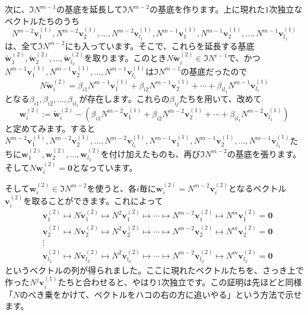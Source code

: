 次に、$\Im N^{m - 1}$の基底を延長して$\Im N^{m - 2}$の基底を作ります。上に現れた$1$次独立なベクトルたちのうち
\[
N^{m - 2} \bm{v}^{(1)}_{1}, N^{m - 2} \bm{v}^{(1)}_{2}, \ldots, N^{m - 2} \bm{v}^{(1)}_{l_1}, N^{m - 1} \bm{v}^{(1)}_{1}, N^{m - 1} \bm{v}^{(1)}_{2}, \ldots, N^{m - 1} \bm{v}^{(1)}_{l_1}
\]
は、全て$\Im N^{m - 2}$にも入っています。そこで、これらを延長する基底$\tilde{\bm{w}}^{(2)}_1, \tilde{\bm{w}}^{(2)}_2, \ldots, \tilde{\bm{w}}^{(2)}_{l_2}$を取ります。このとき$N \tilde{\bm{w}}^{(2)}_i \in \Im N^{i - 1}$で、かつ$N^{m - 1}\bm{v}^{(1)}_1, N^{m - 1}\bm{v}^{(1)}_2, \ldots, N^{m - 1}\bm{v}^{(1)}_{l_1}$は$\Im N^{m - 1}$の基底だったので
\[
N \tilde{\bm{w}}^{(2)}_i = \beta_{i1} N^{m - 1}\bm{v}^{(1)}_1 + \beta_{i2} N^{m - 1}\bm{v}^{(1)}_2 + \cdots + \beta_{i l_1} N^{m - 1}\bm{v}^{(1)}_{l_1}
\]
となる$\beta_{i1}, \beta_{i2}, \ldots, \beta_{i l_1}$が存在します。これらの$\beta_{ij}$たちを用いて、改めて
\[
\bm{w}^{(2)}_i := \tilde{\bm{w}}^{(2)}_i - (\beta_{i1} N^{m - 2}\bm{v}^{(1)}_1 + \beta_{i2} N^{m - 2}\bm{v}^{(1)}_2 + \cdots + \beta_{i l_1} N^{m - 2}\bm{v}^{(1)}_{l_1})
\]
と定めてみます。すると$N^{m - 2} \bm{v}^{(1)}_{1}, N^{m - 2} \bm{v}^{(1)}_{2}, \ldots, N^{m - 2} \bm{v}^{(1)}_{l_1}, N^{m - 1} \bm{v}^{(1)}_{1}, N^{m - 1} \bm{v}^{(1)}_{2}, \ldots, N^{m - 1} \bm{v}^{(1)}_{l_1}$たちに$\bm{w}^{(2)}_1, \bm{w}^{(2)}_2, \ldots, \bm{w}^{(2)}_{l_2}$を付け加えたものも、再び$\Im N^{m - 2}$の基底を張ります。そして$N \bm{w}^{(2)}_i = \bm{0}$となっています。

そして$\bm{w}^{(2)}_i \in \Im N^{m - 2}$を使うと、各$i$毎に$\bm{w}^{(2)}_i = N^{m - 2} \bm{v}^{(2)}_i$となるベクトル$\bm{v}^{(2)}_i$を取ることができます。これによって
\begin{align*}
&\bm{v}^{(2)}_1 \mapsto N \bm{v}^{(2)}_1 \mapsto N^2 \bm{v}^{(2)}_1 \mapsto \cdots \mapsto N^{m - 2} \bm{v}^{(2)}_1 \mapsto N^m \bm{v}^{(2)}_1 = \bm{0} \\
&\bm{v}^{(2)}_2 \mapsto N \bm{v}^{(2)}_2 \mapsto N^2 \bm{v}^{(2)}_2 \mapsto \cdots \mapsto N^{m - 2} \bm{v}^{(2)}_2 \mapsto N^m \bm{v}^{(2)}_2 = \bm{0} \\
&\vdots \\
&\bm{v}^{(2)}_{l_2} \mapsto N \bm{v}^{(2)}_{l_2} \mapsto N^2 \bm{v}^{(2)}_{l_2} \mapsto \cdots \mapsto N^{m - 2} \bm{v}^{(2)}_{l_2} \mapsto N^m \bm{v}^{(2)}_{l_2} = \bm{0}
\end{align*}
というベクトルの列が得られました。ここに現れたベクトルたちを、さっき上で作った$N^j \bm{v}^{(1)}_i$たちと合わせると、やはり$1$次独立です。この証明は先ほどと同様「$N$のべき乗をかけて、ベクトルをハコの右の方に追いやる」という方法で示せます。

